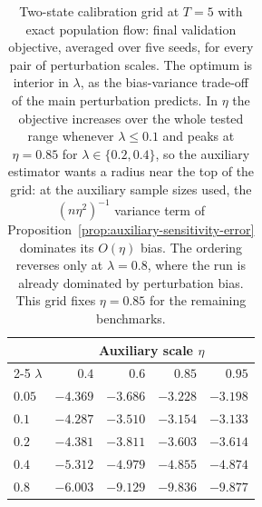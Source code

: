 \begin{table}[H]
\centering
\begin{tabular}{lrrrr}
\toprule
& \multicolumn{4}{c}{Auxiliary scale $\eta$} \\
\cmidrule(lr){2-5}
$\lambda$ & $0.4$ & $0.6$ & $0.85$ & $0.95$ \\
\midrule
$0.05$ & $-4.369$ & $-3.686$ & $-3.228$ & $-3.198$ \\
$0.1$ & $-4.287$ & $-3.510$ & $-3.154$ & $\mathbf{-3.133}$ \\
$0.2$ & $-4.381$ & $-3.811$ & $-3.603$ & $-3.614$ \\
$0.4$ & $-5.312$ & $-4.979$ & $-4.855$ & $-4.874$ \\
$0.8$ & $-6.003$ & $-9.129$ & $-9.836$ & $-9.877$ \\
\bottomrule
\end{tabular}
\caption{Two-state calibration grid at $T=5$ with exact population flow: final validation objective, averaged over five seeds, for every pair of perturbation scales. The optimum is interior in $\lambda$, as the bias-variance trade-off of the main perturbation predicts. In $\eta$ the objective increases over the whole tested range whenever $\lambda\leq0.1$ and peaks at $\eta=0.85$ for $\lambda\in\{0.2,0.4\}$, so the auxiliary estimator wants a radius near the top of the grid: at the auxiliary sample sizes used, the $(n\eta^2)^{-1}$ variance term of Proposition~\ref{prop:auxiliary-sensitivity-error} dominates its $O(\eta)$ bias. The ordering reverses only at $\lambda=0.8$, where the run is already dominated by perturbation bias. This grid fixes $\eta=0.85$ for the remaining benchmarks.}
\label{tab:twostate-grid}
\end{table}
